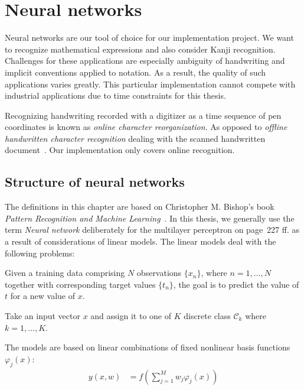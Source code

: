 \chapter{Neural networks}
%
Neural networks are our tool of choice for our implementation project.
We want to recognize mathematical expressions and also consider Kanji recognition.
Challenges for these applications are especially ambiguity of handwriting and implicit
conventions applied to notation. As a result, the quality of such applications
varies greatly.
This particular implementation cannot compete with industrial applications due to time constraints for this thesis.

Recognizing handwriting recorded with a digitizer as a time sequence of pen
coordinates is known as \emph{online character reorganization}.
As opposed to \emph{offline handwritten character recognition} dealing
with the scanned handwritten document~\cite{kumar2013offline}.
Our implementation only covers online recognition.

\section{Structure of neural networks}
%
The definitions in this chapter are based on Christopher M. Bishop's book \emph{Pattern Recognition and Machine Learning}~\cite{Bishop}.
In this thesis, we generally use the term \emph{Neural network} deliberately for the multilayer perceptron on page~227 ff. as a result of considerations of linear models.
The linear models deal with the following problems:

\begin{problem}
  Given a training data comprising $N$ observations $\{x_n\}$, where $n = 1, \ldots, N$ together with corresponding target values $\{t_n\}$, the goal is to predict the value of $t$ for a new value of $x$.~\cite[p.~138]{Bishop}
\end{problem}
\begin{problem}
  Take an input vector $x$ and assign it to one of $K$ discrete class $\mathcal C_k$ where $k = 1, \ldots, K$.~\cite[p.~179]{Bishop}
\end{problem}

The models are based on linear combinations of fixed nonlinear basis functions~$\varphi_j(x)$:
\begin{align}
  y(x, w) &= f\left(\sum_{j=1}^M w_j \varphi_j(x)\right)
\end{align}

